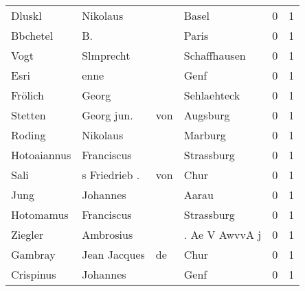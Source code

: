 \documentclass[10pt,a4paper,landscape]{article}
\begin{document}
\begin{longtable}{llllrr}
                   Dluskl &                           Nikolaus &             &                                       Basel &          0 &         1 \\
                 Bbchetel &                                 B. &             &                                       Paris &          0 &         1 \\
                     Vogt &                          Slmprecht &             &                                Schaffhausen &          0 &         1 \\
                     Esri &                               enne &             &                                        Genf &          0 &         1 \\
                  Frölich &                              Georg &             &                                 Sehlaehteck &          0 &         1 \\
                  Stetten &                        Georg  jun. &         von &                                    Augsburg &          0 &         1 \\
                   Roding &                           Nikolaus &             &                                     Marburg &          0 &         1 \\
              Hotoaiannus &                         Franciscus &             &                                  Strassburg &          0 &         1 \\
                     Sali &                      s Friedrieb . &         von &                                        Chur &          0 &         1 \\
                     Jung &                           Johannes &             &                                       Aarau &          0 &         1 \\
                Hotomamus &                         Franciscus &             &                                  Strassburg &          0 &         1 \\
                  Ziegler &                          Ambrosius &             &                              . Ae V AwvvA j &          0 &         1 \\
                  Gambray &                       Jean Jacques &          de &                                        Chur &          0 &         1 \\
                Crispinus &                           Johannes &             &                                        Genf &          0 &         1 \\

\end{longtable}
\end{document}
